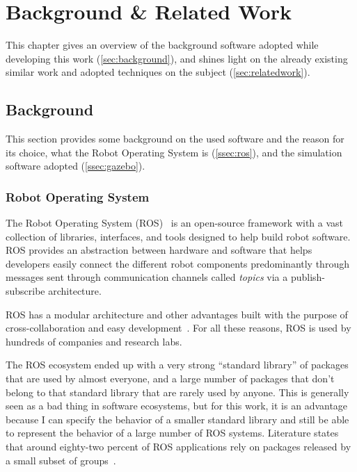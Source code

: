 \chapter{Background \& Related Work}
\label{chap:background}

This chapter gives an overview of the background software adopted while developing this work (\autoref{sec:background}), and shines light on the already existing similar work and adopted techniques on the subject (\autoref{sec:relatedwork}).


\section{Background}
\label{sec:background}

This section provides some background on the used software and the reason for its choice, what the Robot Operating System is (\autoref{ssec:ros}), and the simulation software adopted (\autoref{ssec:gazebo}).


\subsection{Robot Operating System}
\label{ssec:ros}

The Robot Operating System (ROS)~\cite{quigley2009ros} is an open-source framework with a vast collection of libraries, interfaces, and tools designed to help build robot software. ROS provides an abstraction between hardware and software that helps developers easily connect the different robot components predominantly through messages sent through communication channels called \textit{topics} via a publish-subscribe architecture.

ROS has a modular architecture and other advantages built with the purpose of cross-collaboration and easy development~\cite{ros-industrial}. For all these reasons, ROS is used by hundreds of companies and research labs.

The ROS ecosystem ended up with a very strong \enquote{standard library} of packages that are used by almost everyone, and a large number of packages that don't belong to that standard library that are rarely used by anyone. This is generally seen as a bad thing in software ecosystems, but for this work, it is an advantage because I can specify the behavior of a smaller standard library and still be able to represent the behavior of a large number of ROS systems. Literature states that around eighty-two percent of ROS applications rely on packages released by a small subset of groups~\cite{9240632}.


